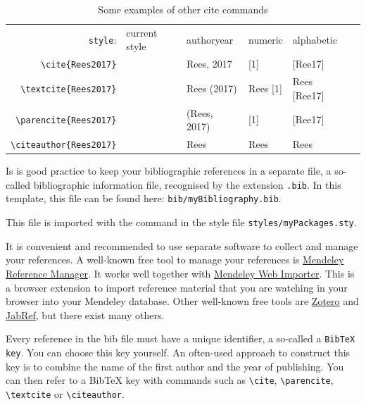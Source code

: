 \begin{table}\centering
    \caption{Some examples of other cite commands}\label{tab:cites}
        \begin{tabular}{rlllll}
        \toprule
            \verb|style|: 	            &	current	style           &	authoryear	&	numeric	    &	alphabetic	\\[+1.5ex]
            \verb|\cite{Rees2017}| 	    &	\cite{Rees2017}	        &	Rees, 2017	&	[1]	        &	[Ree17]	    \\
            \verb|\textcite{Rees2017}| 	&	\textcite{Rees2017}	    &	Rees (2017)	&	Rees [1]	&	Rees [Ree17]\\
            \verb|\parencite{Rees2017}| &	\parencite{Rees2017}	&	(Rees, 2017)&	[1]	        &	[Ree17]	    \\
            \verb|\citeauthor{Rees2017}|&	\citeauthor{Rees2017}	&	Rees	    &	Rees	    &	Rees	    \\
        \bottomrule
        \end{tabular}
\end{table}

Is is good practice to keep your bibliographic references in a separate file, a so-called bibliographic information file, recognised by the extension \verb|.bib|. In this template, this file can be found here: \verb|bib/myBibliography.bib|.

This file is imported with the command \verb|| in the style file \verb|styles/myPackages.sty|. 

It is convenient and recommended to use separate software to collect and manage your references. A well-known free tool to manage your references is \href{https://www.mendeley.com/}{Mendeley Reference Manager}. It works well together with \href{https://www.mendeley.com/reference-management/web-importer}{Mendeley Web Importer}. This is a browser extension to import reference material that you are watching in your browser into your Mendeley database.  Other well-known free tools are \href{https://www.zotero.org/}{Zotero} and \href{https://www.jabref.org/}{JabRef}, but there exist many others.

Every reference in the bib file must have a unique identifier, a so-called a \verb|BibTeX key|. You can choose this key yourself. An often-used approach to construct this key is to combine the name of the first author and the year of publishing. You can then refer to a BibTeX key with commands such as \verb|\cite|, \verb|\parencite|, \verb|\textcite| or \verb|\citeauthor|. 

